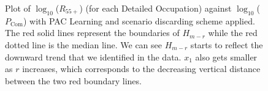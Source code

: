 \documentclass[11pt]{article}
\begin{document}
\begin{figure}[!htb]
    \ContinuedFloat
    \centering
	\hfill	
	\hfill
	\caption{Plot of $\log_{10}$($R_{55+}$) (for each Detailed Occupation) against $\log_{10}$($P_{\text{Com}}$) with PAC Learning and scenario discarding scheme applied. The red solid lines represent the boundaries of $H_{m-r}$ while the red dotted line is the median line. We can see $H_{m-r}$ starts to reflect the downward trend that we identified in the data. $x_{1}$ also gets smaller as $r$ increases, which corresponds to the decreasing vertical distance between the two red boundary lines.}
  	\label{fig:pac2}

\end{figure}
\end{document}
